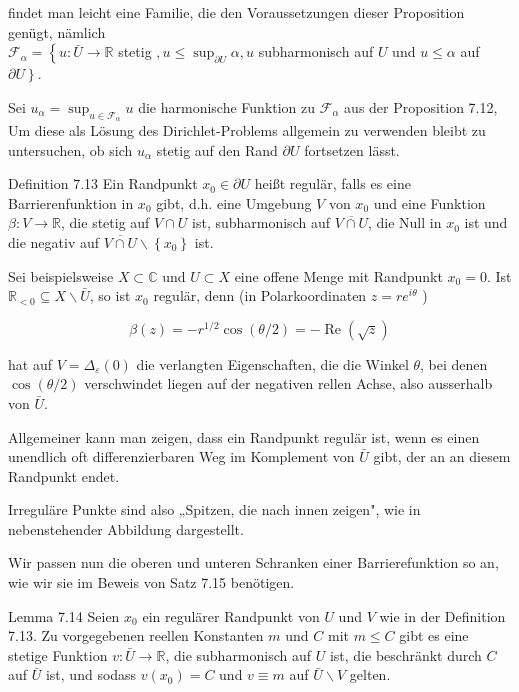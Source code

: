 \documentclass[10pt, letterpaper]{article}
\begin{document}
findet man leicht eine Familie, die den Voraussetzungen dieser Proposition genügt, nämlich\\
$\mathcal{F}_{\alpha}=\left\{u: \bar{U} \rightarrow \mathbb{R}\right.$ stetig $, u \leq \sup _{\partial U} \alpha, u$ subharmonisch auf $U$ und $u \leq \alpha$ auf $\left.\partial U\right\}$.

Sei $u_{\alpha}=\sup _{u \in \mathcal{F}_{\alpha}} u$ die harmonische Funktion zu $\mathcal{F}_{\alpha}$ aus der Proposition 7.12, Um diese als Lösung des Dirichlet-Problems allgemein zu verwenden bleibt zu untersuchen, ob sich $u_{\alpha}$ stetig auf den Rand $\partial U$ fortsetzen lässt.

Definition 7.13 Ein Randpunkt $x_{0} \in \partial U$ heißt regulär, falls es eine Barrierenfunktion in $x_{0}$ gibt, d.h. eine Umgebung $V$ von $x_{0}$ und eine Funktion $\beta: V \longrightarrow \mathbb{R}$, die stetig auf $V \cap U$ ist, subharmonisch auf $\overline{V \cap U}$, die Null in $x_{0}$ ist und die negativ auf $\overline{V \cap U} \backslash\left\{x_{0}\right\}$ ist.

Sei beispielsweise $X \subset \mathbb{C}$ und $U \subset X$ eine offene Menge mit Randpunkt $x_{0}=0$. Ist $\mathbb{R}_{<0} \subseteq X \backslash \bar{U}$, so ist $x_{0}$ regulär, denn (in Polarkoordinaten $z=r e^{i \theta}$ )

$$
\beta(z)=-r^{1 / 2} \cos (\theta / 2)=-\operatorname{Re}(\sqrt{z})
$$

hat auf $V=\Delta_{\varepsilon}(0)$ die verlangten Eigenschaften, die die Winkel $\theta$, bei denen $\cos (\theta / 2)$ verschwindet liegen auf der negativen rellen Achse, also ausserhalb von $\bar{U}$.

Allgemeiner kann man zeigen, dass ein Randpunkt regulär ist, wenn es einen unendlich oft differenzierbaren Weg im Komplement von $\bar{U}$ gibt, der an an diesem Randpunkt endet.

Irreguläre Punkte sind also „Spitzen, die nach innen zeigen", wie in nebenstehender Abbildung dargestellt.

Wir passen nun die oberen und unteren Schranken einer Barrierefunktion so an, wie wir sie im Beweis von Satz 7.15 benötigen.

Lemma 7.14 Seien $x_{0}$ ein regulärer Randpunkt von $U$ und $V$ wie in der Definition 7.13. Zu vorgegebenen reellen Konstanten $m$ und $C$ mit $m \leq C$ gibt es eine stetige Funktion $v: \bar{U} \rightarrow \mathbb{R}$, die subharmonisch auf $U$ ist, die beschränkt durch $C$ auf $\bar{U}$ ist, und sodass $v\left(x_{0}\right)=C$ und $v \equiv m$ auf $\bar{U} \backslash V$ gelten.
\end{document}
